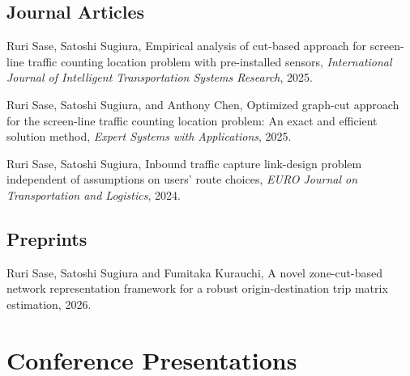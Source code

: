 \documentclass[letterpaper,11pt]{article}
\begin{document}
\subsection*{Journal Articles}
\begin{enumerate}[leftmargin=0.3in, label=\arabic*.]
    \small{
    \item Ruri Sase, Satoshi Sugiura, Empirical analysis of cut-based approach for screen-line traffic counting location problem with pre-installed sensors, \textit{International Journal of Intelligent Transportation Systems Research}, 2025.
    \item Ruri Sase, Satoshi Sugiura, and Anthony Chen, Optimized graph-cut approach for the screen-line traffic counting location problem: An exact and efficient solution method, \textit{Expert Systems with Applications}, 2025.
    \item Ruri Sase, Satoshi Sugiura, Inbound traffic capture link-design problem independent of assumptions on users’ route choices, \textit{EURO Journal on Transportation and Logistics}, 2024.
    }
\end{enumerate}

\subsection*{Preprints}
\begin{enumerate}[leftmargin=0.3in, label=\arabic*.]
    \small{
    \item Ruri Sase, Satoshi Sugiura and Fumitaka Kurauchi, A novel zone-cut-based network representation framework for a robust origin-destination trip matrix estimation, 2026.
    }
\end{enumerate}

\section{Conference Presentations}
\end{document}
